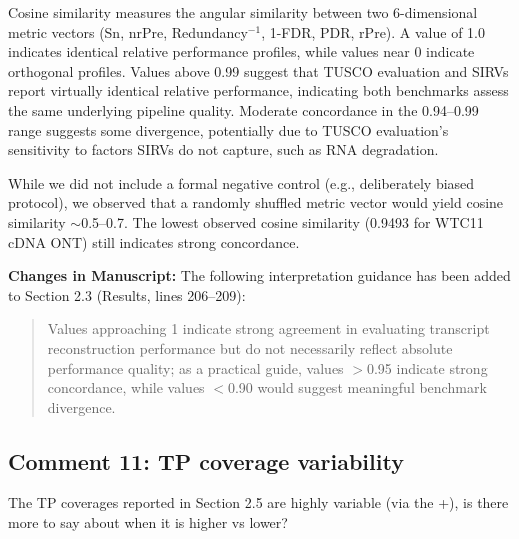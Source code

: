 \documentclass[11pt]{article}
\begin{document}
\begin{responseboxnew}
Cosine similarity measures the angular similarity between two 6-dimensional metric vectors (Sn, nrPre, Redundancy$^{-1}$, 1-FDR, PDR, rPre). A value of 1.0 indicates identical relative performance profiles, while values near 0 indicate orthogonal profiles. Values above 0.99 suggest that TUSCO evaluation and SIRVs report virtually identical relative performance, indicating both benchmarks assess the same underlying pipeline quality. Moderate concordance in the 0.94--0.99 range suggests some divergence, potentially due to TUSCO evaluation's sensitivity to factors SIRVs do not capture, such as RNA degradation.

While we did not include a formal negative control (e.g., deliberately biased protocol), we observed that a randomly shuffled metric vector would yield cosine similarity $\sim$0.5--0.7. The lowest observed cosine similarity (0.9493 for WTC11 cDNA ONT) still indicates strong concordance.

\vspace{0.3cm}
\textbf{Changes in Manuscript:} The following interpretation guidance has been added to Section 2.3 (Results, lines 206--209):

\begin{quote}
Values approaching 1 indicate strong agreement in evaluating transcript reconstruction performance but do not necessarily reflect absolute performance quality; as a practical guide, values $>$0.95 indicate strong concordance, while values $<$0.90 would suggest meaningful benchmark divergence.
\end{quote}
\end{responseboxnew}

\subsection{Comment 11: TP coverage variability}

\begin{reviewercomment}
The TP coverages reported in Section 2.5 are highly variable (via the +), is there more to say about when it is higher vs lower?
\end{reviewercomment}
\end{document}
